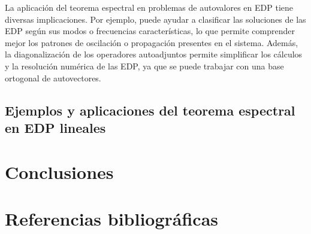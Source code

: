 \documentclass{article}
\begin{document}
    La aplicación del teorema espectral en problemas de autovalores en EDP tiene diversas implicaciones. Por ejemplo, puede ayudar a clasificar las soluciones de las EDP según sus modos o frecuencias características, lo que permite comprender mejor los patrones de oscilación o propagación presentes en el sistema. Además, la diagonalización de los operadores autoadjuntos permite simplificar los cálculos y la resolución numérica de las EDP, ya que se puede trabajar con una base ortogonal de autovectores.

    \subsection{Ejemplos y aplicaciones del teorema espectral en EDP lineales}

\newpage

\section{Conclusiones}
\newpage

\section{Referencias bibliográficas}
\end{document}
